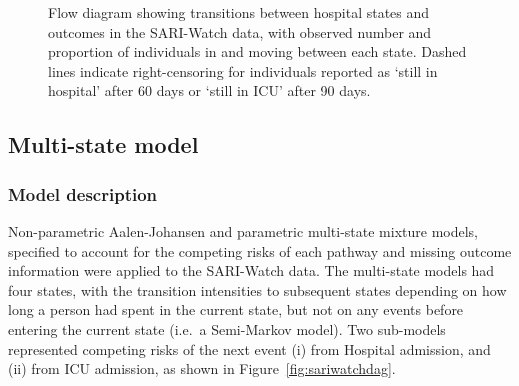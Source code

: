 \begin{figure}[htbp!]
    \caption[Flow diagram showing transitions between hospital states and outcomes in the SARI-Watch data]{Flow diagram showing transitions between hospital states and outcomes in the SARI-Watch data, with observed number and proportion of individuals in and moving between each state. Dashed lines indicate right-censoring for individuals reported as `still in hospital' after 60 days or `still in ICU' after 90 days.}\label{fig:sariwatchtransitions}
\end{figure}

\subsection{Multi-state model}

\subsubsection{Model description}

Non-parametric Aalen-Johansen and parametric multi-state mixture models, specified to account for the competing risks of each pathway and missing outcome information were applied to the SARI-Watch data. The multi-state models had four states, with the transition intensities to subsequent states depending on how long a person had spent in the current state, but not on any events before entering the current state (i.e.\ a Semi-Markov model). Two sub-models represented competing risks of the next event (i) from Hospital admission, and (ii) from ICU admission, as shown in Figure~\ref{fig:sariwatchdag}.

